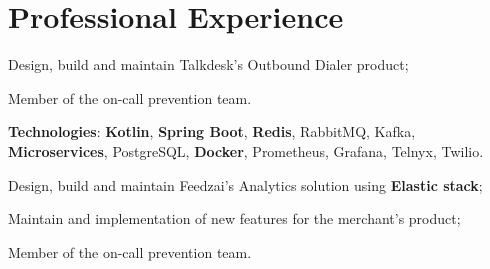 \documentclass[letterpaper]{deedy-resume} %
\begin{document}
%
\begin{minipage}[t]{0.64\textwidth} %


\section{Professional Experience}
\vspace{0.5mm}

\vspace{4.0mm}
\begin{tightitemize}
	\item Design, build and maintain Talkdesk's Outbound Dialer product;
	\item Member of the on-call prevention team.
\end{tightitemize}

 
\vspace{0.75mm}

\textbf{Technologies}: \textbf{Kotlin}, \textbf{Spring Boot}, \textbf{Redis}, RabbitMQ, Kafka, \textbf{Microservices}, PostgreSQL, \textbf{Docker}, Prometheus, Grafana, Telnyx, Twilio.


\vspace{4.5mm}



\vspace{0.5mm}
\begin{tightitemize}
	\item Design, build and maintain Feedzai's Analytics solution using \textbf{Elastic stack};
	\item Maintain and implementation of new features for the merchant's product;
	\item Member of the on-call prevention team.
\end{tightitemize}


\end{minipage}
\end{document}
